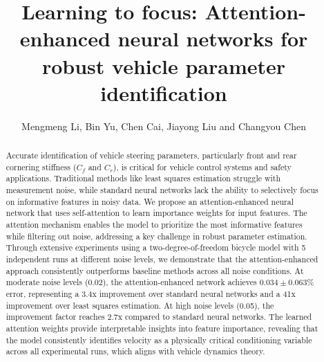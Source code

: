 \documentclass[Afour,sageh,times]{sagej}
\begin{document}

\title{Learning to focus: Attention-enhanced neural networks for robust vehicle parameter identification}

\author{Mengmeng Li, Bin Yu, Chen Cai, Jiayong Liu and Changyou Chen }




\begin{abstract}
Accurate identification of vehicle steering parameters, particularly front and rear cornering stiffness ($C_f$ and $C_r$), is critical for vehicle control systems and safety applications. Traditional methods like least squares estimation struggle with measurement noise, while standard neural networks lack the ability to selectively focus on informative features in noisy data. We propose an attention-enhanced neural network that uses self-attention to learn importance weights for input features. The attention mechanism enables the model to prioritize the most informative features while filtering out noise, addressing a key challenge in robust parameter estimation. Through extensive experiments using a two-degree-of-freedom bicycle model with 5 independent runs at different noise levels, we demonstrate that the attention-enhanced approach consistently outperforms baseline methods across all noise conditions. At moderate noise levels (0.02), the attention-enhanced network achieves $0.034 \pm 0.063$\% error, representing a 3.4x improvement over standard neural networks and a 41x improvement over least squares estimation. At high noise levels (0.05), the improvement factor reaches 2.7x compared to standard neural networks. The learned attention weights provide interpretable insights into feature importance, revealing that the model consistently identifies velocity as a physically critical conditioning variable across all experimental runs, which aligns with vehicle dynamics theory.
\end{abstract}


\maketitle
\end{document}
